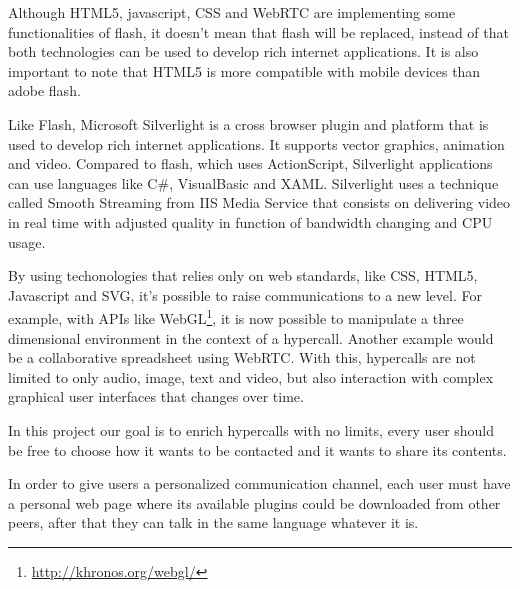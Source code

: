   Although \ac{HTML}5, javascript, \ac{CSS} and \ac{WebRTC} are implementing some functionalities of flash, it doesn't mean that flash will be replaced, instead of that both technologies can be used to develop rich internet applications. It is also important to note that \ac{HTML}5 is more compatible with mobile devices than adobe flash. 

  Like Flash, Microsoft Silverlight is a cross browser plugin and platform that is used to develop rich internet applications. It supports vector graphics, animation and video. Compared to flash, which uses ActionScript, Silverlight applications can use languages like C\#, VisualBasic and \ac{XAML}. Silverlight uses a technique called Smooth Streaming from IIS Media Service that consists on delivering video in real time with adjusted quality in function of bandwidth changing and \ac{CPU} usage.

  By using techonologies that relies only on web standards, like \ac{CSS}, \ac{HTML}5, Javascript and \ac{SVG}, it's possible to raise communications to a new level. For example, with \ac{API}s like WebGL\footnote{\url{http://khronos.org/webgl/}}, it is now possible to manipulate a three dimensional environment in the context of a hypercall. Another example would be a collaborative spreadsheet using WebRTC. With this, hypercalls are not limited to only audio, image, text and video, but also interaction with complex graphical user interfaces that changes over time.

  In this project our goal is to enrich hypercalls with no limits, every user should be free to choose how it wants to be contacted and it wants to share its contents.

  In order to give users a personalized communication channel, each user must have a personal web page where its available plugins could be downloaded from other peers, after that they can talk in the same language whatever it is.
